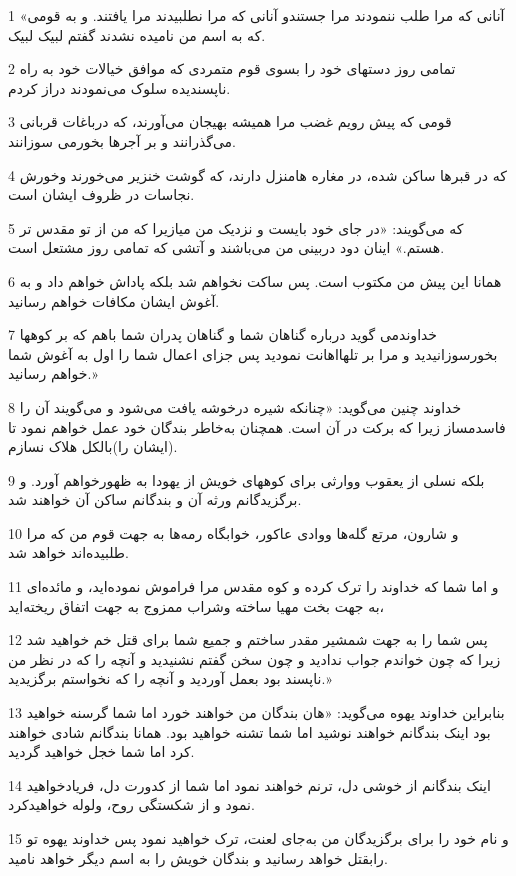 \par 1 «آنانی که مرا طلب ننمودند مرا جستندو آنانی که مرا نطلبیدند مرا یافتند. و به قومی که به اسم من نامیده نشدند گفتم لبیک لبیک.
\par 2 تمامی روز دستهای خود را بسوی قوم متمردی که موافق خیالات خود به راه ناپسندیده سلوک می‌نمودند دراز کردم.
\par 3 قومی که پیش رویم غضب مرا همیشه بهیجان می‌آورند، که درباغات قربانی می‌گذرانند و بر آجرها بخورمی سوزانند.
\par 4 که در قبرها ساکن شده، در مغاره هامنزل دارند، که گوشت خنزیر می‌خورند وخورش نجاسات در ظروف ایشان است.
\par 5 که می‌گویند: «در جای خود بایست و نزدیک من میازیرا که من از تو مقدس تر هستم.» اینان دود دربینی من می‌باشند و آتشی که تمامی روز مشتعل است.
\par 6 همانا این پیش من مکتوب است. پس ساکت نخواهم شد بلکه پاداش خواهم داد و به آغوش ایشان مکافات خواهم رسانید.
\par 7 خداوندمی گوید درباره گناهان شما و گناهان پدران شما باهم که بر کوهها بخور‌سوزانیدید و مرا بر تلهااهانت نمودید پس جزای اعمال شما را اول به آغوش شما خواهم رسانید.»
\par 8 خداوند چنین می‌گوید: «چنانکه شیره درخوشه یافت می‌شود و می‌گویند آن را فاسدمساز زیرا که برکت در آن است. همچنان به‌خاطر بندگان خود عمل خواهم نمود تا (ایشان را)بالکل هلاک نسازم.
\par 9 بلکه نسلی از یعقوب ووارثی برای کوههای خویش از یهودا به ظهورخواهم آورد. و برگزیدگانم ورثه آن و بندگانم ساکن آن خواهند شد.
\par 10 و شارون، مرتع گله‌ها ووادی عاکور، خوابگاه رمه‌ها به جهت قوم من که مرا طلبیده‌اند خواهد شد.
\par 11 و اما شما که خداوند را ترک کرده و کوه مقدس مرا فراموش نموده‌اید، و مائده‌ای به جهت بخت مهیا ساخته وشراب ممزوج به جهت اتفاق ریخته‌اید،
\par 12 پس شما را به جهت شمشیر مقدر ساختم و جمیع شما برای قتل خم خواهید شد زیرا که چون خواندم جواب ندادید و چون سخن گفتم نشنیدید و آنچه را که در نظر من ناپسند بود بعمل آوردید و آنچه را که نخواستم برگزیدید.»
\par 13 بنابراین خداوند یهوه می‌گوید: «هان بندگان من خواهند خورد اما شما گرسنه خواهید بود اینک بندگانم خواهند نوشید اما شما تشنه خواهید بود. همانا بندگانم شادی خواهند کرد اما شما خجل خواهید گردید.
\par 14 اینک بندگانم از خوشی دل، ترنم خواهند نمود اما شما از کدورت دل، فریادخواهید نمود و از شکستگی روح، ولوله خواهیدکرد.
\par 15 و نام خود را برای برگزیدگان من به‌جای لعنت، ترک خواهید نمود پس خداوند یهوه تو رابقتل خواهد رسانید و بندگان خویش را به اسم دیگر خواهد نامید.
